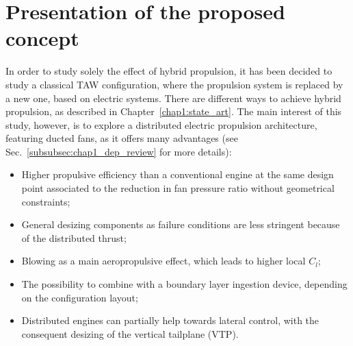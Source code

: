 \section{Presentation of the proposed concept}
\label{sec:chap3_taw_hybrid_dep_pres}

In order to study solely the effect of hybrid propulsion, it has been decided to study a classical TAW configuration, where the propulsion system is replaced by a new one, based on electric systems. 
There are different ways to achieve hybrid propulsion, as described in Chapter~\ref{chap1:state_art}. 
The main interest of this study, however, is to explore a distributed electric propulsion architecture, featuring ducted fans, as it offers many advantages (see Sec.~\ref{subsubsec:chap1_dep_review} for more details):
\begin{itemize}
	\item Higher propulsive efficiency than a conventional engine at the same design point associated to the reduction in fan pressure ratio without geometrical constraints;
	
	\item General desizing components as failure conditions are less stringent because of the distributed thrust;
	
	\item Blowing as a main aeropropulsive effect, which leads to higher local $C_l$;
	
	\item The possibility to combine with a boundary layer ingestion device, depending on the configuration layout;
	
	\item Distributed engines can partially help towards lateral control, with the consequent desizing of the vertical tailplane (VTP). 
\end{itemize}

